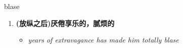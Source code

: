 
\begin{frame}
{\huge blase}
\begin{center}
\begin{enumerate}\Large
  \item \textbf{(放纵之后)厌倦享乐的，腻烦的}
  \begin{itemize}
    \item \em{\Large{years of extravagance has made him totally blase}}
  \end{itemize}
\end{enumerate}
\end{center}
\end{frame}
